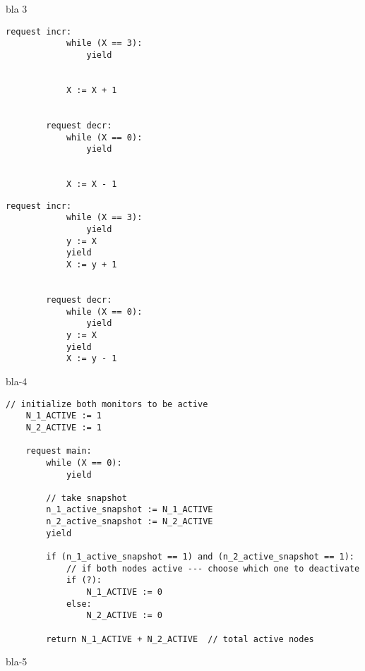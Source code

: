 \vspace{2em}
bla 3

\noindent
\begin{minipage}[t]{0.45\textwidth}
	\begin{lstlisting}[caption={Fred (serializable)}]
		request incr: 
		    while (X == 3):
		        yield
		        
		        
		    X := X + 1
		
		
		request decr: 
		    while (X == 0): 
		        yield
		        
		        
		    X := X - 1
	\end{lstlisting}
\end{minipage}
\hfill
\begin{minipage}[t]{0.45\textwidth}
	\begin{lstlisting}[caption={Fred2 (not serializable)}]
		request incr:
		    while (X == 3):
		        yield
		    y := X
		    yield
		    X := y + 1
		
		
		request decr: 
		    while (X == 0):
		        yield
		    y := X
		    yield
		    X := y - 1
	\end{lstlisting}
\end{minipage}
	

bla-4

\begin{minipage}[t]{1.0\textwidth}
\begin{lstlisting}[caption={Snapshot-based monitor deactivation (not serializable, as it can return a sume of 0 active monitors)}]
	// initialize both monitors to be active
    N_1_ACTIVE := 1
    N_2_ACTIVE := 1
	
    request main:
        while (X == 0):
            yield
		
        // take snapshot
        n_1_active_snapshot := N_1_ACTIVE
        n_2_active_snapshot := N_2_ACTIVE
        yield
		
        if (n_1_active_snapshot == 1) and (n_2_active_snapshot == 1):
            // if both nodes active --- choose which one to deactivate 
            if (?): 
                N_1_ACTIVE := 0
            else:
                N_2_ACTIVE := 0

        return N_1_ACTIVE + N_2_ACTIVE  // total active nodes
\end{lstlisting}
\end{minipage}
	


bla-5


